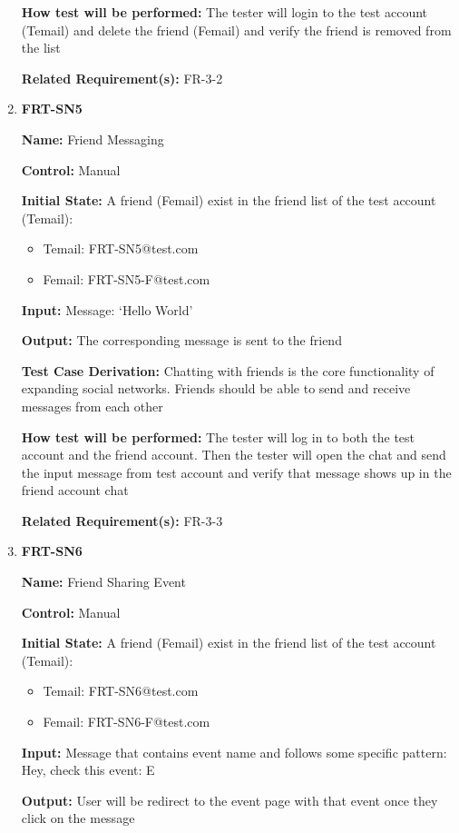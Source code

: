 \documentclass[12pt, titlepage]{article}
\begin{document}
\begin{enumerate}
\textbf{How test will be performed:} The tester will login to the test account (Temail) and delete the friend (Femail) and verify the friend is removed from the list

\textbf{Related Requirement(s):} FR-3-2

\item{\textbf{FRT-SN5}}

\textbf{Name:} Friend Messaging

\textbf{Control:} Manual
					
\textbf{Initial State:} A friend (Femail) exist in the friend list of the test account (Temail):
\begin{itemize}
\item Temail: FRT-SN5@test.com
\item Femail: FRT-SN5-F@test.com
\end{itemize}

\textbf{Input:} Message: `Hello World'
					
\textbf{Output:} The corresponding message is sent to the friend

\textbf{Test Case Derivation:} Chatting with friends is the core functionality of expanding social networks. Friends should be able to send and receive messages from each other
					
\textbf{How test will be performed:} The tester will log in to both the test account and the friend account. Then the tester will open the chat and send the input message from test account and verify that message shows up in the friend account chat

\textbf{Related Requirement(s):} FR-3-3

\item{\textbf{FRT-SN6}}

\textbf{Name:} Friend Sharing Event

\textbf{Control:} Manual
					
\textbf{Initial State:} A friend (Femail) exist in the friend list of the test account (Temail):
\begin{itemize}
\item Temail: FRT-SN6@test.com
\item Femail: FRT-SN6-F@test.com
\end{itemize}

\textbf{Input:} Message that contains event name and follows some specific pattern:
Hey, check this event: \textunderscore E\textunderscore[EXPO]
					
\textbf{Output:} User will be redirect to the event page with that event once they click on the message


\end{enumerate}
\end{document}
